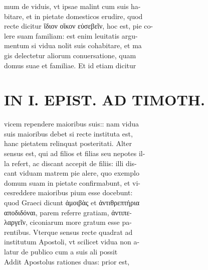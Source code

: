 \documentclass{article}
\begin{document}
\begin{pages}
                mum de viduis, vt ipsae malint cum suis ha- \\
                bitare, et in pietate domesticos erudire, quod \\
                recte dicitur ἴδιον οἴκον εὐσεβεῖν, hoc est, pie co- \\
                lere suam familiam: est enim leuitatis argu- \\
                mentum si vidua nolit suis cohabitare, et ma \\
                gis delectetur aliorum conuersatione, quam \\
                domus suae et familiae. Et id etiam dicitur \\
                
\section*{IN I. EPIST. AD TIMOTH. \\
                }
vicem rependere maioribus suis:: nam vidua \\
                suis maioribus debet si recte instituta est, \\
                hanc pietatem relinquat posteritati. Alter \\
                sensus est, qui ad filios et filias seu nepotes il- \\
                la refert, ac discant accepit de filiis: illi dis- \\
                cant viduam matrem pie alere, quo exemplo \\
                domum suam in pietate confirmabunt, et vi- \\
                cesreddere maioribus pium esse docebunt: \\
                quod Graeci dicunt ἁμοιβὰς et ἀντιθρεπτήρια \\
                αποδιδόναι, parem referre gratiam, ἀντιπε- \\
                λαργεῖν, ciconiarum more gratum esse pa- \\
                rentibus. Vterque sensus recte quadrat ad \\
                institutum Apostoli, vt scilicet vidua non a- \\
                latur de publico cum a suis ali possit \\
                Addit Apostolus rationes duas: prior est, \\

\end{pages}
\end{document}
